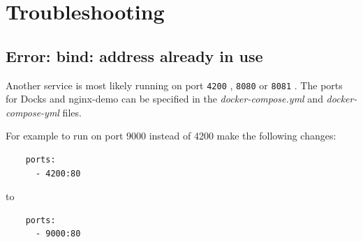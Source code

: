 \documentclass[]{article}
\let\oldtexttt\texttt
\renewcommand{\texttt}[1]{
	\colorbox{Light}{\oldtexttt{#1}}
}
\begin{document}
\section{Troubleshooting}
\subsection{Error: bind: address already in use}
Another service is most likely running on port \texttt{4200}, \texttt{8080} or \texttt{8081}.
The ports for Docks and nginx-demo can be specified in the \emph{docker-compose.yml} 
and \emph{docker-compose-yml} files.

For example to run on port 9000 instead of 4200 make the following changes:

\begin{lstlisting}
    ports:
      - 4200:80
\end{lstlisting}
to
\begin{lstlisting}
    ports:
      - 9000:80
\end{lstlisting}
\end{document}
